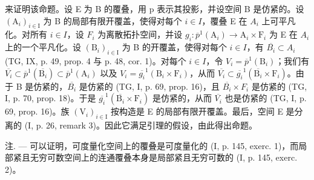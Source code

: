 来证明该命题。设 E 为 B 的覆叠，用 p 表示其投影，并设空间 B 是仿紧的。设 \((\mathrm{A}_{i})_{i\in\mathrm{I}}\) 为 B 的局部有限开覆盖，使得对每个 \(i\in I\)，覆叠 E 在 \(A_{i}\) 上可平凡化。对所有 \(i\in I\)，设 \(F_{i}\) 为离散拓扑空间，并设 \(g_{i}\colon\overline{p}^{1}(\mathrm{A}_{i})\to\mathrm{A}_{i}\times\mathrm{F}_{i}\) 为 E 在 \(A_{i}\) 上的一个平凡化。设 \((\mathrm{B}_{i})_{i\in\mathrm{I}}\) 为 B 的开覆盖，使得对每个 \(i\in I\)，有 \(\overline{B_{i}}\subset A_{i}\) (TG, IX, p. 49, prop. 4 与 p. 48, cor. 1)。对每个 \(i\in I\)，令 \(V_{i}=\overline{p}^{1}(\mathrm{B}_{i})\)；我们有 \(\overline{V_{i}}\subset\overline{p}^{1}(\overline{\mathrm{B}_{i}})\subset\overline{p}^{1}(\mathrm{A}_{i})\) 以及 \(V_{i}=\overline{g_{i}}^{1}(\mathrm{B}_{i}\times\mathrm{F}_{i})\)，从而 \(\overline{V_{i}}\subset\overline{g_{i}}^{1}(\overline{\mathrm{B}_{i}}\times\mathrm{F}_{i})\)。由于 B 是仿紧的，\(\overline{B_{i}}\) 是仿紧的 (TG, I, p. 69, prop. 16)，且 \(\overline{B_{i}}\times F_{i}\) 是仿紧的 (TG, I, p. 70, prop. 18)。于是 \(\overline{g_{i}}^{1}(\overline{\mathrm{B}_{i}}\times\mathrm{F}_{i})\) 是仿紧的，从而 \(\overline{V_{i}}\) 也是仿紧的 (TG, I, p. 69, prop. 16)。族 \((\mathrm{V}_{i})_{i\in\mathrm{I}}\) 按构造是 E 的局部有限开覆盖。最后，空间 E 是分离的 (I, p. 26, remark 3)。因此它满足引理的假设，由此得出命题。

注. --- 可以证明，可度量化空间上的覆叠是可度量化的 (I, p. 145, exerc. 1)，而局部紧且无穷可数空间上的连通覆叠本身是局部紧且无穷可数的 (I, p. 145, exerc. 2)。

